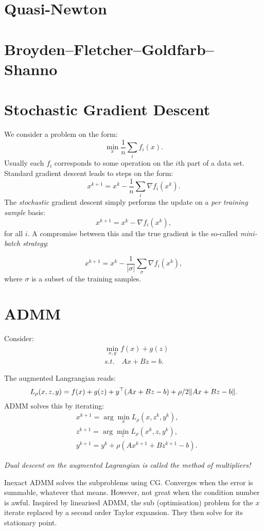 \section{Quasi-Newton}

\section{Broyden–Fletcher–Goldfarb–Shanno}

\section{Stochastic Gradient Descent}

We consider a problem on the form:
\[  
\min_x \frac1n \sum_i f_i(x).
\]
Usually each $f_i$ corresponds to some operation on the $i$th part of
a data set. Standard gradient descent leads to steps on the form:
\[
x^{k+1} = x^k - \frac1n \sum_i \nabla f_i (x^k).
\]
The \emph{stochastic} gradient descent simply performs the update on a
\emph{per training sample} basis:
\[
x^{k+1} = x^k - \nabla f_i (x^k),
\]
for all $i$. A compromise between this and the true gradient is the
so-called \emph{mini-batch strategy}:

\[
x^{k+1} = x^k - \frac{1}{|\sigma|}\sum_{\sigma}\nabla f_i (x^k),
\]
where $\sigma$ is a subset of the training samples.

\section{ADMM}

Consider:
\begin{align}
& \min_{x,y} f(x) + g(z)\\
& s.t.\quad Ax + Bz = b.
\end{align}

The augmented Langrangian reads:
\[
L_\rho(x,z,y) =  f(x) + g(z) + y^\top (Ax + Bz - b) + \rho/2\|Ax + Bz - b\|.
\]
ADMM solves this by iterating:
\begin{align}
& x^{k+1} = \arg\min_x L_\rho (x, z^k, y^k),\\
& z^{k+1} = \arg\min_z L_\rho (x^k, z, y^k),\\
& y^{k+1} = y^k + \rho(Ax^{k+1} + Bz^{k+1} - b).
\end{align}

\emph{Dual descent on the augmented Lagrangian is called the
method of multipliers!}


Inexact ADMM solves the subproblems using CG. Converges when the
error is summable, whatever that means. However, not great when
the condition number is awful. Inspired by linearised ADMM, the
sub (optimisation) problem for the $x$ iterate replaced by a second
order Taylor expansion. They then solve for its stationary point.

